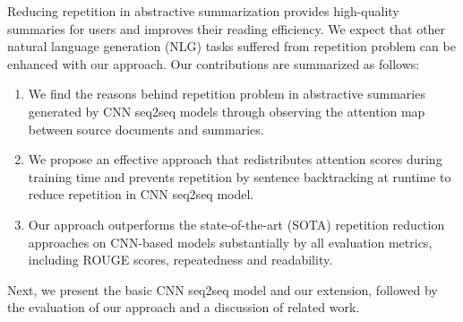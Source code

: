 Reducing repetition in abstractive summarization provides high-quality summaries for users and improves their reading efficiency.
We expect that other natural language generation (NLG) tasks suffered from repetition problem can be enhanced with our approach. 
Our contributions are summarized as follows:
\begin{enumerate}
\item We find the reasons behind repetition problem in abstractive summaries generated by CNN seq2seq models through observing the attention map between source documents and summaries.
\item We propose an effective approach that redistributes attention scores 
during training time and prevents repetition by sentence backtracking
at runtime to reduce repetition in CNN seq2seq model.
\item Our approach
outperforms the state-of-the-art (SOTA) repetition reduction approaches on CNN-based models
substantially by all evaluation metrics, including ROUGE scores, 
repeatedness and readability.
\end{enumerate}

Next, we present the basic CNN seq2seq model and our extension, 
followed by the evaluation of our approach and a discussion of related work.
